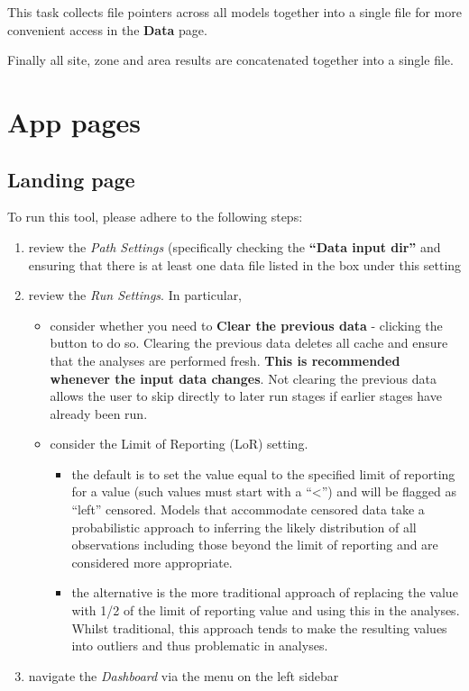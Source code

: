 \documentclass[
  8pt,
  a4paper]{article}
\providecommand{\tightlist}{%
  \setlength{\itemsep}{0pt}\setlength{\parskip}{0pt}}
\begin{document}
This task collects file pointers across all models together into a
single file for more convenient access in the \textbf{Data} page.

Finally all site, zone and area results are concatenated together into a
single file.

\section{App pages}\label{app-pages}

\subsection{Landing page}\label{sec-landing}

To run this tool, please adhere to the following steps:

\begin{enumerate}
\def\labelenumi{\arabic{enumi}.}
\tightlist
\item
  review the \emph{Path Settings} (specifically checking the
  \textbf{``Data input dir''} and ensuring that there is at least one
  data file listed in the box under this setting
\item
  review the \emph{Run Settings}. In particular,

  \begin{itemize}
  \tightlist
  \item
    consider whether you need to \textbf{Clear the previous data} -
    clicking the button to do so. Clearing the previous data deletes all
    cache and ensure that the analyses are performed fresh. \textbf{This
    is recommended whenever the input data changes}. Not clearing the
    previous data allows the user to skip directly to later run stages
    if earlier stages have already been run.
  \item
    consider the Limit of Reporting (LoR) setting.

    \begin{itemize}
    \tightlist
    \item
      the default is to set the value equal to the specified limit of
      reporting for a value (such values must start with a
      ``\textless{}'') and will be flagged as ``left'' censored. Models
      that accommodate censored data take a probabilistic approach to
      inferring the likely distribution of all observations including
      those beyond the limit of reporting and are considered more
      appropriate.
    \item
      the alternative is the more traditional approach of replacing the
      value with 1/2 of the limit of reporting value and using this in
      the analyses. Whilst traditional, this approach tends to make the
      resulting values into outliers and thus problematic in analyses.
    \end{itemize}
  \end{itemize}
\item
  navigate the \emph{Dashboard} via the menu on the left sidebar
\end{enumerate}
\end{document}
